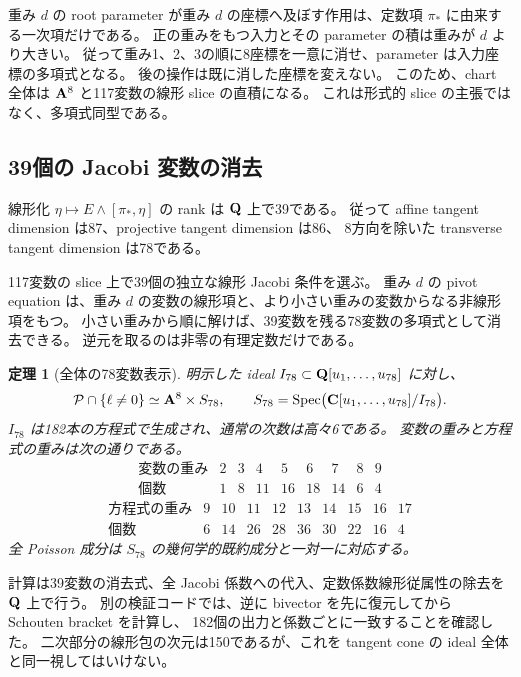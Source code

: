\documentclass[11pt,a4paper]{ltjsarticle}
\newtheorem{theorem}{定理}[section]\newtheorem{proposition}[theorem]{命題}\newtheorem{lemma}[theorem]{補題}\newtheorem{corollary}[theorem]{系}
\theoremstyle{remark}\newtheorem{remark}[theorem]{注意}\renewcommand{\proofname}{証明}
\begin{document}
重み $d$ の root parameter が重み $d$ の座標へ及ぼす作用は、定数項 $\pi_*$ に由来する一次項だけである。
正の重みをもつ入力とその parameter の積は重みが $d$ より大きい。
従って重み1、2、3の順に8座標を一意に消せ、parameter は入力座標の多項式となる。
後の操作は既に消した座標を変えない。
このため、chart 全体は $\AA^8$ と117変数の線形 slice の直積になる。
これは形式的 slice の主張ではなく、多項式同型である。

\subsection{39個の Jacobi 変数の消去}
線形化 $\eta\mapsto E\wedge[\pi_*,\eta]$ の rank は $\QQ$ 上で39である。
従って affine tangent dimension は87、projective tangent dimension は86、
8方向を除いた transverse tangent dimension は78である。

117変数の slice 上で39個の独立な線形 Jacobi 条件を選ぶ。
重み $d$ の pivot equation は、重み $d$ の変数の線形項と、より小さい重みの変数からなる非線形項をもつ。
小さい重みから順に解けば、39変数を残る78変数の多項式として消去できる。
逆元を取るのは非零の有理定数だけである。

\begin{theorem}[全体の78変数表示]
明示した ideal $I_{78}\subset\QQ[u_1,\ldots,u_{78}]$ に対し、
\[
 \cP\cap\{\ell\ne0\}\simeq
 \AA^8\times S_{78},\qquad
 S_{78}=\Spec\bigl(\CC[u_1,\ldots,u_{78}]/I_{78}\bigr).
\]
$I_{78}$ は182本の方程式で生成され、通常の次数は高々6である。
変数の重みと方程式の重みは次の通りである。
\[
\begin{array}{c|rrrrrrrr}
\text{変数の重み}&2&3&4&5&6&7&8&9\\\hline
\text{個数}&1&8&11&16&18&14&6&4
\end{array}
\]
\[
\begin{array}{c|rrrrrrrrr}
\text{方程式の重み}&9&10&11&12&13&14&15&16&17\\\hline
\text{個数}&6&14&26&28&36&30&22&16&4
\end{array}
\]
全 Poisson 成分は $S_{78}$ の幾何学的既約成分と一対一に対応する。
\end{theorem}

計算は39変数の消去式、全 Jacobi 係数への代入、定数係数線形従属性の除去を $\QQ$ 上で行う。
別の検証コードでは、逆に bivector を先に復元してから Schouten bracket を計算し、
182個の出力と係数ごとに一致することを確認した。
二次部分の線形包の次元は150であるが、これを tangent cone の ideal 全体と同一視してはいけない。
\end{document}
